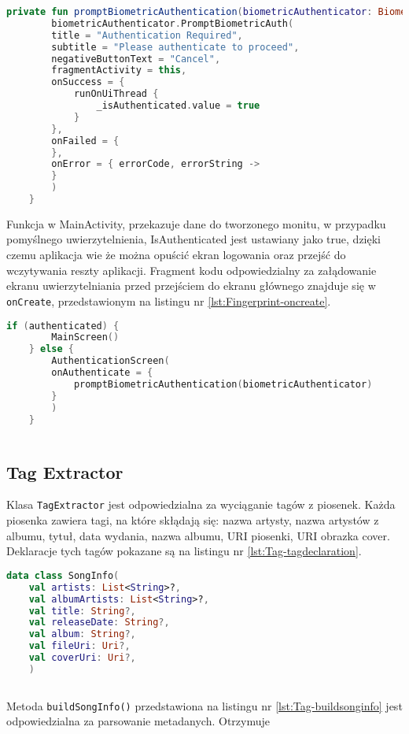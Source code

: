 \begin{lstlisting}[caption=Obsługa wyniku monitu, label={lst:Fingerprint-monitfinish}, language=kotlin]
	private fun promptBiometricAuthentication(biometricAuthenticator: BiometricAuthenticator) {
		biometricAuthenticator.PromptBiometricAuth(
		title = "Authentication Required",
		subtitle = "Please authenticate to proceed",
		negativeButtonText = "Cancel",
		fragmentActivity = this,
		onSuccess = {
			runOnUiThread {
				_isAuthenticated.value = true
			}
		},
		onFailed = {
		},
		onError = { errorCode, errorString ->
		}
		)
	}
\end{lstlisting}
Funkcja w MainActivity, przekazuje dane do tworzonego monitu, w przypadku pomyślnego uwierzytelnienia, IsAuthenticated jest ustawiany jako true, dzięki czemu aplikacja wie że można opuścić ekran logowania oraz przejść do wczytywania reszty aplikacji. Fragment kodu odpowiedzialny za załądowanie ekranu uwierzytelniania przed przejściem do ekranu głównego znajduje się w \texttt{onCreate}, przedstawionym na listingu nr \ref{lst:Fingerprint-oncreate}.
\begin{lstlisting}[caption=Zawartosć \texttt{onCreate}, label={lst:Fingerprint-oncreate}, language=kotlin]
	if (authenticated) {
		MainScreen()
	} else {
		AuthenticationScreen(
		onAuthenticate = {
			promptBiometricAuthentication(biometricAuthenticator)
		}
		)
	}
	
\end{lstlisting}

\subsection{Tag Extractor}
Klasa \texttt{TagExtractor} jest odpowiedzialna za wyciąganie tagów z piosenek. Każda piosenka zawiera tagi, na które skłądają się: nazwa artysty, nazwa artystów z albumu, tytuł, data wydania, nazwa albumu, URI piosenki, URI obrazka cover. Deklaracje tych tagów pokazane są na listingu nr \ref{lst:Tag-tagdeclaration}.


\begin{lstlisting}[caption=Deklaracja tagów, label={lst:Tag-tagdeclaration}, language=kotlin]
	data class SongInfo(
	val artists: List<String>?,
	val albumArtists: List<String>?,
	val title: String?,
	val releaseDate: String?,
	val album: String?,
	val fileUri: Uri?,
	val coverUri: Uri?,
	)
	
\end{lstlisting}

Metoda \texttt{buildSongInfo()} przedstawiona na listingu nr \ref{lst:Tag-buildsonginfo} jest odpowiedzialna za parsowanie metadanych. Otrzymuje 

